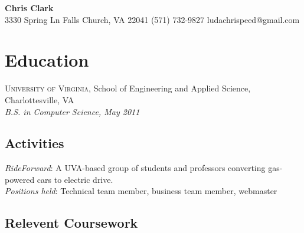 \documentclass[a4paper,11pt]{article}
\begin{document}
\begin{center}
{\sffamily \huge \textbf{Chris Clark}} \\
3330 Spring Ln \enspace\textopenbullet\enspace Falls Church, VA
22041 \enspace\textopenbullet\enspace (571)
732-9827 \enspace\textopenbullet\enspace ludachrispeed@gmail.com
\end{center}


\vspace{-7pt}
\section*{Education}

  \textsc{University of Virginia}, School of Engineering and Applied Science,
  Charlottesville, VA \\
  \textit{B.S. in Computer Science, May 2011}

  \subsection*{Activities}

  \textit{RideForward}: A UVA-based group of students and professors converting
  gas-powered cars to electric drive. \\ 
  \textsl{Positions held}: Technical team member, business team member, webmaster

  \subsection*{Relevent Coursework}
\end{document}
